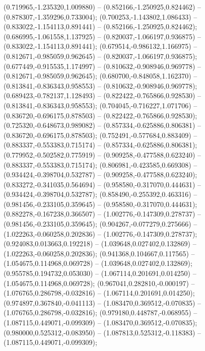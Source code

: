  (0.719965,-1.235320,1.009880) -- (0.852166,-1.250925,0.824462) -- (0.878307,-1.359296,0.733004);
 (0.700253,-1.143802,1.086433) -- (0.833022,-1.154113,0.891441) -- (0.852166,-1.250925,0.824462);
 (0.686995,-1.061558,1.137925) -- (0.820037,-1.066197,0.936875) -- (0.833022,-1.154113,0.891441);
 (0.679514,-0.986132,1.166975) -- (0.812671,-0.985059,0.962645) -- (0.820037,-1.066197,0.936875);
 (0.677449,-0.915535,1.174997) -- (0.810632,-0.908946,0.969778) -- (0.812671,-0.985059,0.962645);
 (0.680700,-0.848058,1.162370) -- (0.813841,-0.836343,0.958553) -- (0.810632,-0.908946,0.969778);
 (0.689423,-0.782137,1.128493) -- (0.822422,-0.765866,0.928530) -- (0.813841,-0.836343,0.958553);
 (0.704045,-0.716227,1.071706) -- (0.836720,-0.696175,0.878503) -- (0.822422,-0.765866,0.928530);
 (0.725320,-0.648673,0.989082) -- (0.857334,-0.625886,0.806381) -- (0.836720,-0.696175,0.878503);
 (0.752491,-0.577684,0.883409) -- (0.883337,-0.553383,0.715174) -- (0.857334,-0.625886,0.806381);
 (0.779952,-0.502582,0.775919) -- (0.909258,-0.477588,0.623240) -- (0.883337,-0.553383,0.715174);
 (0.806981,-0.423585,0.669308) -- (0.934424,-0.398704,0.532787) -- (0.909258,-0.477588,0.623240);
 (0.833272,-0.341035,0.564694) -- (0.958580,-0.317070,0.444631) -- (0.934424,-0.398704,0.532787);
 (0.858490,-0.255392,0.463316) -- (0.981456,-0.233105,0.359645) -- (0.958580,-0.317070,0.444631);
 (0.882278,-0.167238,0.366507) -- (1.002776,-0.147309,0.278737) -- (0.981456,-0.233105,0.359645);
 (0.904267,-0.077279,0.275666) -- (1.022263,-0.060258,0.202836) -- (1.002776,-0.147309,0.278737);
 (0.924083,0.013663,0.192218) -- (1.039648,0.027402,0.132869) -- (1.022263,-0.060258,0.202836);
 (0.941368,0.104667,0.117565) -- (1.054675,0.114968,0.069728) -- (1.039648,0.027402,0.132869);
 (0.955785,0.194732,0.053030) -- (1.067114,0.201691,0.014250) -- (1.054675,0.114968,0.069728);
 (0.967041,0.282810,-0.000197) -- (1.076765,0.286798,-0.032816) -- (1.067114,0.201691,0.014250);
 (0.974897,0.367840,-0.041113) -- (1.083470,0.369512,-0.070835) -- (1.076765,0.286798,-0.032816);
 (0.979180,0.448787,-0.068955) -- (1.087115,0.449071,-0.099309) -- (1.083470,0.369512,-0.070835);
 (0.980000,0.525312,-0.083950) -- (1.087813,0.525312,-0.118383) -- (1.087115,0.449071,-0.099309);
